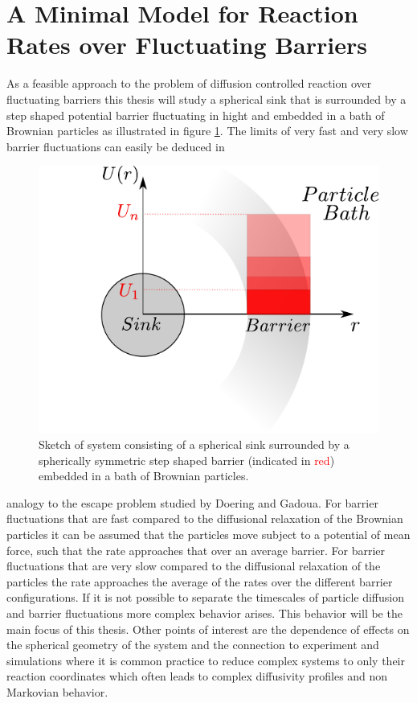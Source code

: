 \section{A Minimal Model for Reaction Rates over Fluctuating Barriers}
\label{mini_model}
As a feasible approach to the problem of diffusion controlled reaction over fluctuating barriers this thesis will study a spherical sink that is surrounded by a step shaped potential barrier fluctuating in hight and embedded in a bath of Brownian particles as illustrated in figure \ref{introSketch}. The limits of very fast and very slow barrier fluctuations can easily be deduced in \par
\begin{figure}
    \hspace{-2 cm}\includegraphics[width = 1.1 \textwidth]{plots/IntroSkizze.pdf}
    \caption{Sketch of system consisting of a spherical sink surrounded by a spherically symmetric step shaped barrier (indicated in \textcolor{red}{red}) embedded in a bath of Brownian particles.}
    \label{introSketch}
\end{figure}
analogy to the escape problem studied by Doering and Gadoua.
For barrier fluctuations that are fast compared to the diffusional relaxation of the Brownian particles it can be assumed that the particles move subject to a potential of mean force, such that the rate approaches that over an average barrier. For barrier fluctuations that are very slow compared to the diffusional relaxation of the particles the rate approaches the average of the rates over the different barrier configurations.
If it is not possible to separate the timescales of particle diffusion and barrier fluctuations more complex behavior arises. This behavior will be the main focus of this thesis. 
Other points of interest are the dependence of effects on the spherical geometry of the system and the connection to experiment and simulations where it is common practice to reduce complex systems to only their reaction coordinates which often leads to complex diffusivity profiles and non Markovian behavior.

